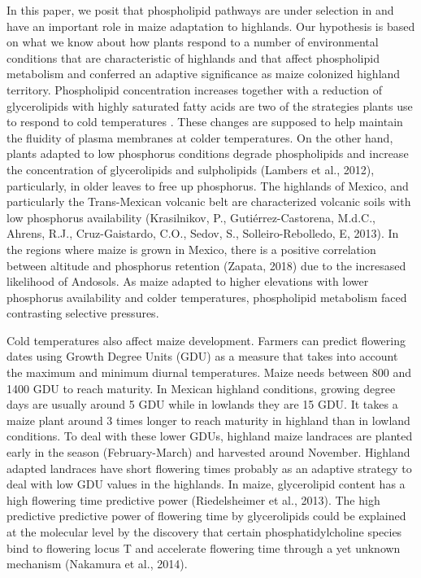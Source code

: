 \documentclass[9pt,twocolumn,twoside,lineno]{gsajnl}
\begin{document}
In this paper, we posit that phospholipid pathways are under selection in and have an important role in maize adaptation to highlands.  
Our hypothesis is based on what we know about how plants respond to a number of environmental conditions that are characteristic of highlands and that affect phospholipid metabolism and conferred an adaptive significance as maize colonized highland territory. 
Phospholipid concentration increases \citep{Degenkolbe2012-wf} together with a reduction of glycerolipids with highly saturated fatty acids \citep{Welti2002-uk} are two of the strategies plants use to respond to cold temperatures \cite{Lynch1987-ln}. 
These changes are supposed to help maintain the fluidity of plasma membranes at colder temperatures. On the other hand, plants adapted to low phosphorus conditions degrade phospholipids and increase the concentration of glycerolipids and sulpholipids (Lambers et al., 2012), particularly, in older leaves to free up phosphorus. 
The highlands of Mexico, and particularly the Trans-Mexican volcanic belt are characterized volcanic soils with low phosphorus availability (Krasilnikov, P., Gutiérrez-Castorena, M.d.C., Ahrens, R.J., Cruz-Gaistardo, C.O., Sedov, S., Solleiro-Rebolledo, E, 2013). 
In the regions where maize is grown in Mexico, there is a positive correlation between altitude and phosphorus retention (Zapata, 2018) due to the incresased likelihood of Andosols.
As maize adapted to higher elevations with lower phosphorus availability and colder temperatures, phospholipid metabolism faced contrasting selective pressures. 

Cold temperatures also affect maize development. Farmers can predict flowering dates using Growth Degree Units (GDU) as a measure  that takes into account the maximum and minimum diurnal temperatures. 
Maize needs between 800 and 1400 GDU to reach maturity. 
In Mexican highland conditions, growing degree days are usually around 5 GDU while in lowlands they are 15 GDU. %
It takes a maize plant around 3 times longer to reach maturity in highland than in lowland conditions. To deal with these lower GDUs, highland maize landraces are planted early in the season (February-March) and harvested around November. 
Highland adapted landraces have short flowering times probably as an adaptive strategy to deal with low GDU values in the highlands.  
In maize, glycerolipid content has a high flowering time predictive power (Riedelsheimer et al., 2013). 
The high predictive predictive power of flowering time by glycerolipids could be explained at the molecular level by the discovery that certain phosphatidylcholine species bind to flowering locus T and accelerate flowering time through a yet unknown mechanism (Nakamura et al., 2014). 
 
\end{document}
